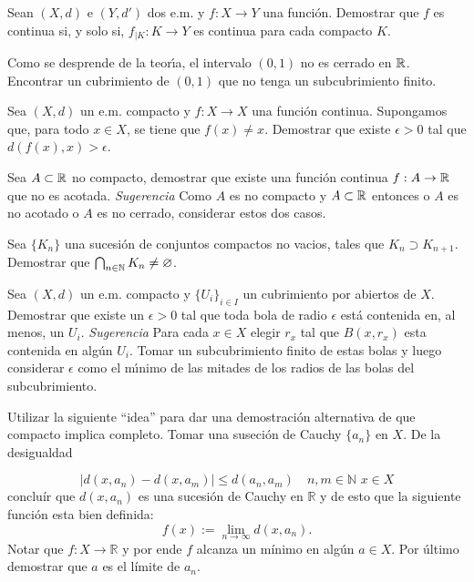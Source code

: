 \begin{ejercicio}{} Sean $(X,d)$ e $(Y,d')$ dos e.m. y $f:X\to Y$
una funci\'on. Demostrar que $f$ es continua si, y solo si,
$f_{|K}:K\to Y$ es continua para cada compacto $K$.
\end{ejercicio}


\begin{ejercicio}{} Como se desprende de la teor\'{\i}a, el intervalo
$(0,1)$ no es cerrado en $\mathbb{R}$. Encontrar un cubrimiento de
$(0,1)$ que no tenga un subcubrimiento finito.
\end{ejercicio}

\begin{ejercicio}{} Sea $(X,d)$ un e.m. compacto y $f:X\to X$ una
funci\'on continua. Supongamos que, para todo $x\in X$, se tiene
que $f(x)\neq x$. Demostrar que existe $\epsilon>0$ tal que
$d(f(x),x)>\epsilon$.
\end{ejercicio}

\begin{ejercicio}{} Sea $A\subset\mathbb{R}$ no compacto, demostrar que
existe una funci\'on continua $f:A\to\mathbb{R}$ que no es acotada.
\emph{Sugerencia} Como $A$ es no compacto y $A\subset \mathbb{R}$
entonces o $A$ es no acotado o $A$ es no cerrado, considerar estos
dos casos.
\end{ejercicio}


\begin{ejercicio}{} Sea $\{K_n\}$ una sucesi\'on de conjuntos
compactos no vacios, tales que $K_n\supset K_{n+1}$. Demostrar que
$\bigcap_{n\in\mathbb{N}}K_n\neq\varnothing$.
\end{ejercicio}

\begin{ejercicio}{} Sea $(X,d)$ un e.m. compacto y $\{U_i\}_{i\in
I}$ un cubrimiento por abiertos de $X$. Demostrar que existe un
$\epsilon>0$ tal que toda bola de radio $\epsilon$ est\'a
contenida en, al menos, un $U_i$. \emph{Sugerencia} Para cada
$x\in X$ elegir $r_x$ tal que $B(x,r_x)$ esta contenida en alg\'un
$U_i$. Tomar un subcubrimiento finito de estas bolas y luego
considerar $\epsilon$ como el m\'{\i}nimo de las mitades de los
radios de las bolas del subcubrimiento.
\end{ejercicio}

 
 \begin{ejercicio}{} Utilizar la siguiente ``idea'' para dar una
 demostración alternativa de que compacto implica completo. Tomar
 una suseción de Cauchy $\{a_n\}$ en $X$. De la desigualdad

 \[
	|d(x,a_n)-d(x,a_m)|\leq d(a_n,a_m)\quad n,m\in\mathbb{N}\,\,
	x\in X
 \]
 concluír que $d(x,a_n)$ es una sucesión de Cauchy en
 $\mathbb{R}$ y de esto que la siguiente función esta bien
 definida:
\[
	f(x):=\lim\limits_{n\to\infty}d(x,a_n).
\]
Notar que $f:X\to\mathbb{R}$ y por ende $f$ alcanza un mínimo en
algún $a\in X$. Por último demostrar que $a$ es el límite de
$a_n$.
\end{ejercicio}

